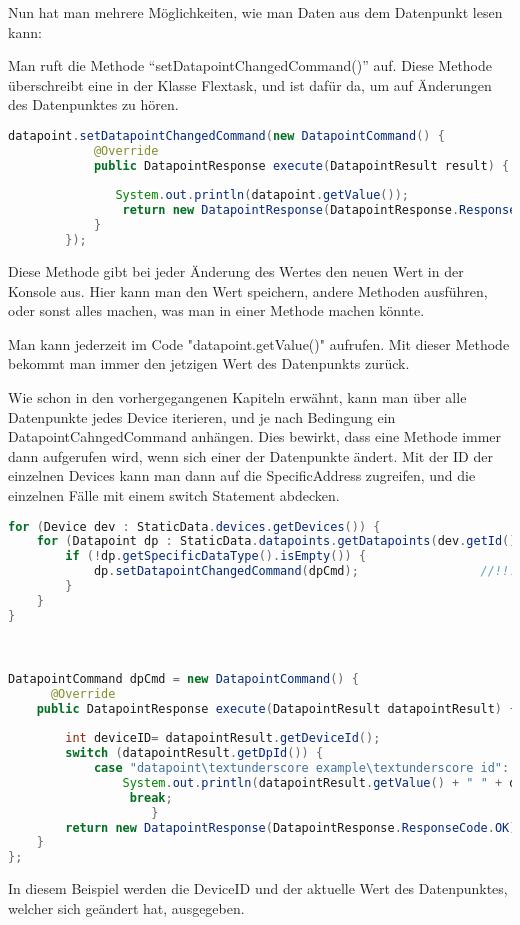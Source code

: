 Nun hat man mehrere Möglichkeiten, wie man Daten aus dem Datenpunkt lesen kann: 
\begin{compactenum}
    \item Man ruft die Methode “setDatapointChangedCommand()” auf. Diese Methode überschreibt eine in der Klasse Flextask, und ist dafür da, um auf Änderungen des Datenpunktes zu hören.
    \begin{lstlisting}[language=java,caption=Example catapoint usage,label=lst:impl:foo]
        datapoint.setDatapointChangedCommand(new DatapointCommand() { 
            @Override 
            public DatapointResponse execute(DatapointResult result) { 
         
               System.out.println(datapoint.getValue()); 
                return new DatapointResponse(DatapointResponse.ResponseCode.OK); 
            } 
        }); 
    \end{lstlisting}
    Diese Methode gibt bei jeder Änderung des Wertes den neuen Wert in der Konsole aus. Hier kann man den Wert speichern, andere Methoden ausführen, oder sonst alles machen, was man in einer Methode machen könnte. 

    \item Man kann jederzeit im Code "datapoint.getValue()" aufrufen. Mit dieser Methode bekommt man immer den jetzigen Wert des Datenpunkts zurück.   
    \item Wie schon in den vorhergegangenen Kapiteln erwähnt, kann man über alle Datenpunkte jedes Device iterieren, und je nach Bedingung ein DatapointCahngedCommand anhängen. Dies bewirkt, dass eine Methode immer dann aufgerufen wird, wenn sich einer der Datenpunkte ändert. Mit der ID der einzelnen Devices kann man dann auf die SpecificAddress zugreifen, und die einzelnen Fälle mit einem switch Statement abdecken. 
    \begin{lstlisting}[language=java,caption=Example multible datapoint usage,label=lst:impl:foo]
        for (Device dev : StaticData.devices.getDevices()) { 
    for (Datapoint dp : StaticData.datapoints.getDatapoints(dev.getId())) { 
        if (!dp.getSpecificDataType().isEmpty()) { 
            dp.setDatapointChangedCommand(dpCmd);                 //!!! 
        } 
    } 
} 

 

DatapointCommand dpCmd = new DatapointCommand() { 
      @Override 
    public DatapointResponse execute(DatapointResult datapointResult) { 
 
        int deviceID= datapointResult.getDeviceId();  
        switch (datapointResult.getDpId()) { 
            case "datapoint\textunderscore example\textunderscore id": 
                System.out.println(datapointResult.getValue() + " " + deviceID ); 
                 break; 
                    } 
        return new DatapointResponse(DatapointResponse.ResponseCode.OK); 
    } 
}; 

    \end{lstlisting}
    In diesem Beispiel werden die DeviceID und der aktuelle Wert des Datenpunktes, welcher sich geändert hat, ausgegeben.
\end{compactenum}

